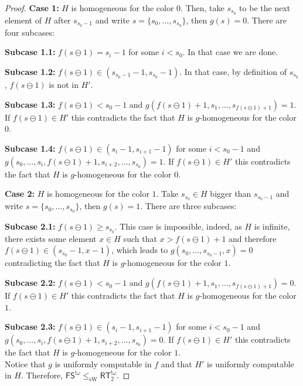 \documentclass[10pt,a4paper]{article}
\newcommand{\FS}[0]{\mathsf{FS}}
\newcommand{\RT}[0]{\mathsf{RT}}
\newcommand{\sW}{\mathrm{sW}}
\numberwithin{theorem}{section}
\begin{document}
\begin{proof}
\textbf{Case 1:} $H$ is homogeneous for the color $0$. Then, take $s_{s_0}$ to be the next element of $H$ after $s_{s_0 - 1}$ and write $s = \{s_0, \dots, s_{s_0}\}$, then $g(s) = 0$. There are four subcases:

\textbf{Subcase 1.1:} $f(s \ominus 1) = s_i - 1$ for some $i < s_0$. In that case we are done.

\textbf{Subcase 1.2:} $f(s \ominus 1) \in (s_{s_0 - 1} - 1, s_{s_0} - 1)$. In that case, by definition of $s_{s_0}$, $f(s \ominus 1)$ is not in $H'$.

\textbf{Subcase 1.3:} $f(s \ominus 1) < s_0 - 1$ and $g(f(s \ominus 1) + 1, s_1, \dots, s_{f(s \ominus 1) + 1}) = 1$. If $f(s \ominus 1) \in H'$ this contradicts the fact that $H$ is $g$-homogeneous for the color $0$. 

\textbf{Subcase 1.4:} $f(s \ominus 1) \in (s_i - 1, s_{i+1} - 1)$ for some $i < s_0 - 1$ and $g(s_0, \dots, s_i, f(s \ominus 1) + 1 ,s_{i+2}, \dots, s_{s_0}) = 1$. If $f(s \ominus 1) \in H'$ this contradicts the fact that $H$ is $g$-homogeneous for the color $0$. 

\textbf{Case 2:} $H$ is homogeneous for the color $1$. Take $s_{s_0} \in H$ bigger than $s_{s_0 - 1}$ and write $s = \{s_0, \dots, s_{s_0}\}$, then $g(s) = 1$. There are three subcases:

\textbf{Subcase 2.1:} $f(s \ominus 1) \geq s_{s_0}$. This case is impossible, indeed, as $H$ is infinite, there exists some element $x \in H$ such that $x > f(s \ominus 1) + 1$ and therefore $f(s \ominus 1) \in (s_{s_0} - 1, x - 1)$, which leads to $g(s_0, \dots, s_{s_0 - 1}, x) = 0$ contradicting the fact that $H$ is $g$-homogeneous for the color $1$.

\textbf{Subcase 2.2:} $f(s \ominus 1) < s_0 - 1$ and $g(f(s \ominus 1) + 1, s_1, \dots, s_{f(s \ominus 1) + 1}) = 0$. If $f(s \ominus 1) \in H'$ this contradicts the fact that $H$ is $g$-homogeneous for the color $1$. 

\textbf{Subcase 2.3:}  $f(s \ominus 1) \in (s_i - 1, s_{i+1} - 1)$ for some $i < s_0 - 1$ and $g(s_0, \dots, s_i, f(s \ominus 1) + 1 ,s_{i+2}, \dots, s_{s_0}) = 0$. If $f(s \ominus 1) \in H'$ this contradicts the fact that $H$ is $g$-homogeneous for the color $1$.  \\

Notice that $g$ is uniformly computable in $f$ and that $H'$ is uniformly computable in $H$. Therefore, $\FS^{!\omega} \leq_{\sW} \RT^{!\omega}_2$.

\end{proof}
\end{document}
